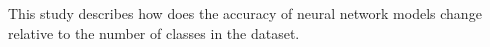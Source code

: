 This study describes how does the accuracy of neural network models change relative to the number of classes in the dataset.
